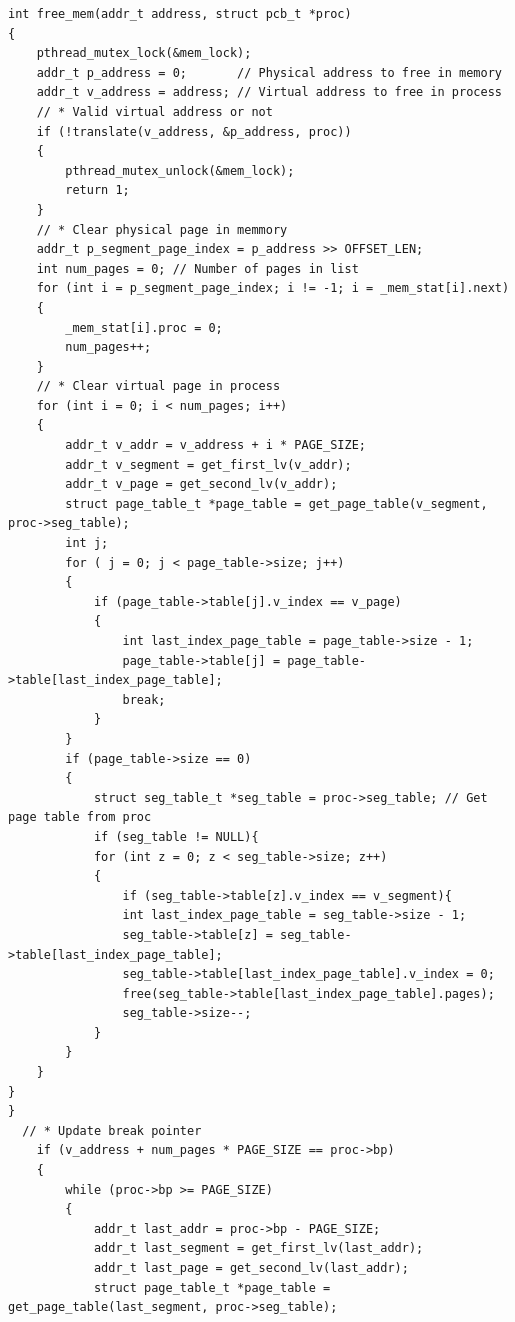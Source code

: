 \documentclass[a4paper]{article}
\numberwithin{equation}{section}
\begin{document}
\begin{mdframed}[leftline=false,rightline=false,backgroundcolor=blue!10,nobreak=false]
  \begin{verbatim}
int free_mem(addr_t address, struct pcb_t *proc)
{
    pthread_mutex_lock(&mem_lock);
    addr_t p_address = 0;       // Physical address to free in memory
    addr_t v_address = address; // Virtual address to free in process
    // * Valid virtual address or not
    if (!translate(v_address, &p_address, proc))
	{
		pthread_mutex_unlock(&mem_lock);
		return 1;
	}
    // * Clear physical page in memmory
    addr_t p_segment_page_index = p_address >> OFFSET_LEN;
    int num_pages = 0; // Number of pages in list
    for (int i = p_segment_page_index; i != -1; i = _mem_stat[i].next)
    {
        _mem_stat[i].proc = 0;
        num_pages++;
    }
    // * Clear virtual page in process
    for (int i = 0; i < num_pages; i++)
    {
        addr_t v_addr = v_address + i * PAGE_SIZE;
        addr_t v_segment = get_first_lv(v_addr);
        addr_t v_page = get_second_lv(v_addr);
        struct page_table_t *page_table = get_page_table(v_segment, proc->seg_table);
        int j;
        for ( j = 0; j < page_table->size; j++)
        {
            if (page_table->table[j].v_index == v_page)
            {
                int last_index_page_table = page_table->size - 1;
                page_table->table[j] = page_table->table[last_index_page_table];
                break;
            }
        }
        if (page_table->size == 0)
        {
            struct seg_table_t *seg_table = proc->seg_table; // Get page table from proc
            if (seg_table != NULL){
            for (int z = 0; z < seg_table->size; z++)
            {
                if (seg_table->table[z].v_index == v_segment){
                int last_index_page_table = seg_table->size - 1;
                seg_table->table[z] = seg_table->table[last_index_page_table];
                seg_table->table[last_index_page_table].v_index = 0;
                free(seg_table->table[last_index_page_table].pages);
                seg_table->size--;
            }
        }
    }
}
}
  // * Update break pointer
    if (v_address + num_pages * PAGE_SIZE == proc->bp)
    {
        while (proc->bp >= PAGE_SIZE)
        {
            addr_t last_addr = proc->bp - PAGE_SIZE;
            addr_t last_segment = get_first_lv(last_addr);
            addr_t last_page = get_second_lv(last_addr);
            struct page_table_t *page_table = get_page_table(last_segment, proc->seg_table);

\end{verbatim}
\end{mdframed}
\end{document}
